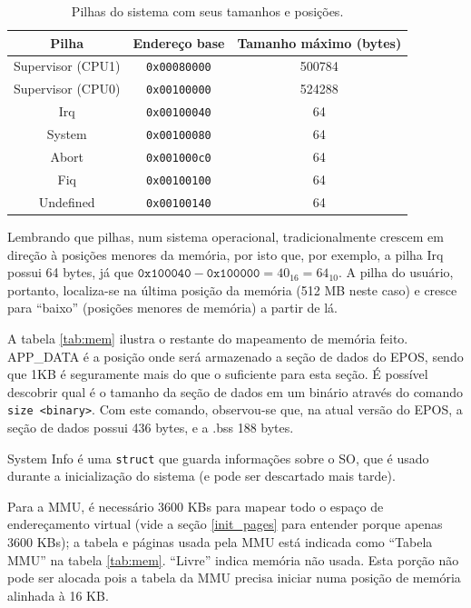 \begin{table}[hb]
	\centering
	\begin{tabular}{ccc}
		\hline \hline
		Pilha & Endereço base & Tamanho máximo (bytes)\\[0.5ex]
		\hline
		Supervisor (CPU1)		& \verb+0x00080000+ & 500784\\
		Supervisor (CPU0)		& \verb+0x00100000+ & 524288\\
		Irq						& \verb+0x00100040+ & 64\\
		System					& \verb+0x00100080+ & 64\\
		Abort					& \verb+0x001000c0+ & 64\\
		Fiq						& \verb+0x00100100+ & 64\\
		Undefined				& \verb+0x00100140+ & 64\\[1ex]
		\hline
	\end{tabular}
	\caption{Pilhas do sistema com seus tamanhos e posições.}
	\label{tab:stacks}
\end{table}

Lembrando que pilhas, num sistema operacional, tradicionalmente crescem em direção à posições menores da memória, por isto que, por exemplo, a pilha Irq possui 64 bytes, já que $\texttt{0x100040}-\texttt{0x100000} = 40_{16} = 64_{10}$. A pilha do usuário, portanto, localiza-se na última posição da memória (512 MB neste caso) e cresce para ``baixo'' (posições menores de memória) a partir de lá.


A tabela \ref{tab:mem} ilustra o restante do mapeamento de memória feito. APP\_DATA é a posição onde será armazenado a seção de dados do EPOS, sendo que 1KB é seguramente mais do que o suficiente para esta seção. É possível descobrir qual é o tamanho da seção de dados em um binário através do comando \verb+size <binary>+. Com este comando, observou-se que, na atual versão do EPOS, a seção de dados possui 436 bytes, e a .bss 188 bytes.

System Info é uma \verb+struct+ que guarda informações sobre o SO, que é usado durante a inicialização do sistema (e pode ser descartado mais tarde).

Para a MMU, é necessário 3600 KBs para mapear todo o espaço de endereçamento virtual (vide a seção \ref{init_pages} para entender porque apenas 3600 KBs); a tabela e páginas usada pela MMU está indicada como ``Tabela MMU'' na tabela \ref{tab:mem}.
``Livre'' indica memória não usada. Esta porção não pode ser alocada pois a tabela da MMU precisa iniciar numa posição de memória alinhada à 16 KB.

